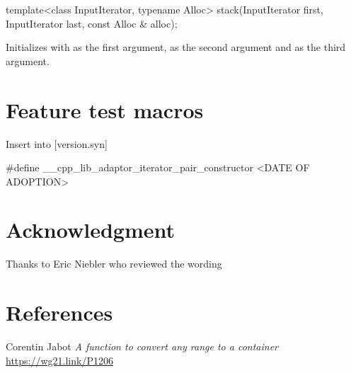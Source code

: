 \documentclass{wg21}
\begin{document}
\begin{addedblock}

\begin{itemdecl}
    template<class InputIterator, typename Alloc>
    stack(InputIterator first, InputIterator last, const Alloc & alloc);
\end{itemdecl}

\begin{itemdescr}
\pnum
\effects
Initializes  with  as the first argument,  as the second argument and  as the third argument.
\end{itemdescr}

\end{addedblock}


\section{Feature test macros}

Insert into [version.syn]

\begin{addedblock}
\begin{codeblock}
#define __cpp_lib_adaptor_iterator_pair_constructor <DATE OF ADOPTION>
\end{codeblock}
\end{addedblock}

\section{Acknowledgment}

Thanks to Eric Niebler who reviewed the wording

\section{References}
\renewcommand{\section}[2]{}%
\begin{thebibliography}{9}
	
	Corentin Jabot
	\emph{A function to convert any range to a container}\newline
	\url{https://wg21.link/P1206}

\end{thebibliography}
\end{document}
